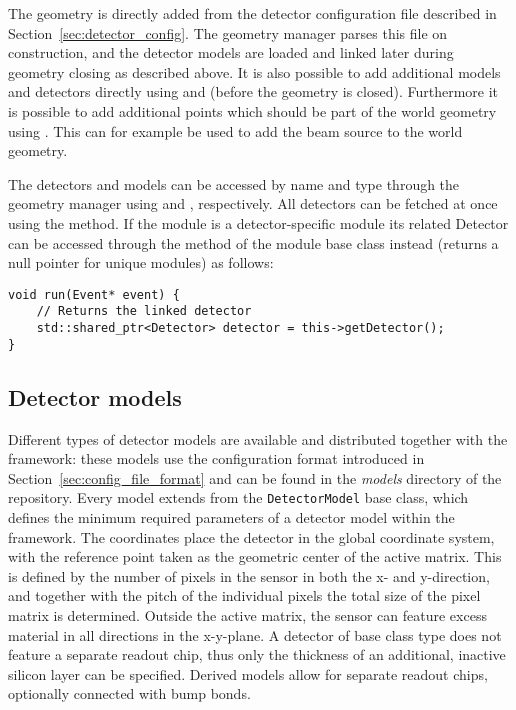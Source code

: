 The geometry is directly added from the detector configuration file described in Section~\ref{sec:detector_config}.
The geometry manager parses this file on construction, and the detector models are loaded and linked later during geometry closing as described above.
It is also possible to add additional models and detectors directly using  and  (before the geometry is closed).
Furthermore it is possible to add additional points which should be part of the world geometry using .
This can for example be used to add the beam source to the world geometry.

The detectors and models can be accessed by name and type through the geometry manager using  and , respectively.
All detectors can be fetched at once using the  method.
If the module is a detector-specific module its related Detector can be accessed through the  method of the module base class instead (returns a null pointer for unique modules) as follows:
\begin{verbatim}
void run(Event* event) {
    // Returns the linked detector
    std::shared_ptr<Detector> detector = this->getDetector();
}
\end{verbatim}

\subsection{Detector models}
\label{sec:detector_models}
Different types of detector models are available and distributed together with the framework: these models use the configuration format introduced in Section~\ref{sec:config_file_format} and can be found in the \textit{models} directory of the repository.
Every model extends from the \texttt{DetectorModel} base class, which defines the minimum required parameters of a detector model within the framework.
The coordinates place the detector in the global coordinate system, with the reference point taken as the geometric center of the active matrix.
This is defined by the number of pixels in the sensor in both the x- and y-direction, and together with the pitch of the individual pixels the total size of the pixel matrix is determined.
Outside the active matrix, the sensor can feature excess material in all directions in the x-y-plane.
A detector of base class type does not feature a separate readout chip, thus only the thickness of an additional, inactive silicon layer can be specified.
Derived models allow for separate readout chips, optionally connected with bump bonds.


